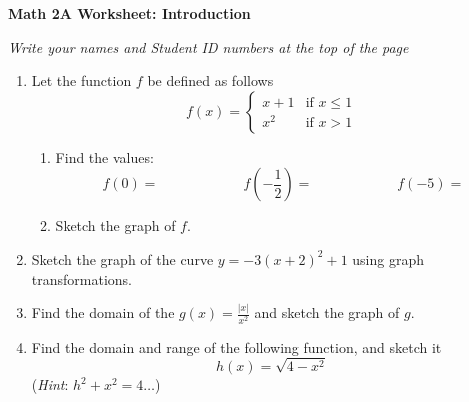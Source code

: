 \documentclass[12pt,fleqn]{article}
\begin{document}
\begin{center}
	\textbf{Math 2A Worksheet: Introduction}
\end{center}

\emph{Write your names and Student ID numbers at the top of the page}

\begin{enumerate}
  \item Let the function $f$ be defined as follows
	\[f(x)=\begin{cases}
	x+1&\text{if }x\le 1\\
	x^2&\text{if }x>1
	\end{cases}\]
	\begin{enumerate}
	  \item Find the values:
	  \[f(0)=\qquad\qquad\qquad f\left(-\frac 12\right)=\qquad\qquad\qquad f(-5)=\]
	  \item Sketch the graph of $f$.
	\end{enumerate}
	
	\vfill
	
	\item Sketch the graph of the curve $y=-3(x+2)^2+1$ using graph transformations.
	
	\vfill\newpage
  
	
	\item Find the domain of the $g(x)=\frac{|x|}{x^2}$ and sketch the graph of $g$.
	
	\vfill
	
	\item Find the domain and range of the following function, and sketch it
	\[h(x)=\sqrt{4-x^2}\]
	(\emph{Hint}: $h^2+x^2=4\ldots$)
	
	\vfill
\end{enumerate}
\end{document}
